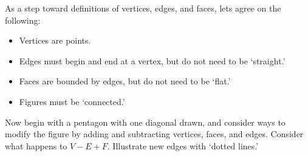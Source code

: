 \documentclass{ximera}
\begin{document}
%
%
%

\begin{question}
As a step toward definitions of vertices, edges, and faces, lets agree on the following: 
\begin{itemize}
\item Vertices are points.
\item Edges must begin and end at a vertex, but do not need to be `straight.' 
\item Faces are bounded by edges, but do not need to be `flat.'  
\item Figures must be `connected.'  
\end{itemize}
Now begin with a pentagon with one diagonal drawn, and consider ways to modify the figure by adding and subtracting vertices, faces, and edges. Consider what happens to $V-E+F$.  Illustrate new edges with `dotted lines.'

\begin{freeResponse}
\end{freeResponse}
\vfill
\end{question}
\end{document}
